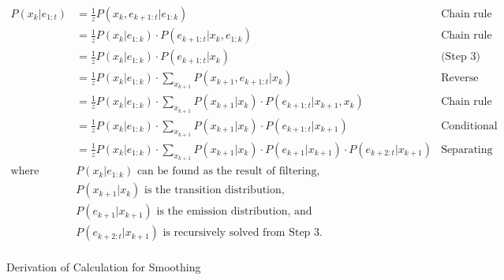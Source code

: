 \begin{landscape}
	\begin{figure}[!htb]
		\caption{Derivation of Calculation for Smoothing}
		\label{eq:smoothing-deriv}
		\begin{align*}
			P(x_k | e_{1:t})
			&= \frac{1}{z} P(x_k, e_{k+1:t} | e_{1:k}) & \textrm{Chain rule} \\
			&= \frac{1}{z} P(x_k | e_{1:k}) \cdot P(e_{k+1:t} | x_k, e_{1:k}) & \textrm{Chain rule} \\
			&= \frac{1}{z} P(x_k | e_{1:k}) \cdot P(e_{k+1:t} | x_k) & \textrm{(Step 3) Conditional 	independence} \\
			&= \frac{1}{z} P(x_k | e_{1:k}) \cdot \sum_{x_{k+1}} P(x_{k+1}, e_{k+1:t} | x_k) & \textrm{Reverse marginalization} \\
			&= \frac{1}{z} P(x_k | e_{1:k}) \cdot \sum_{x_{k+1}} P(x_{k+1} | x_k) \cdot P(e_{k+1:t} | x_{k+1}, x_k) & \textrm{Chain rule} \\
			&= \frac{1}{z} P(x_k | e_{1:k}) \cdot \sum_{x_{k+1}} P(x_{k+1} | x_k) \cdot P(e_{k+1:t} | x_{k+1}) & \textrm{Conditional independence} \\
			&= \frac{1}{z} P(x_k | e_{1:k}) \cdot \sum_{x_{k+1}} P(x_{k+1} | x_k) \cdot P(e_{k+1} | x_{k+1}) \cdot P(e_{k+2:t} | x_{k+1}) & \textrm{Separating multiplied probabilities} \\
			\textrm{where } & P(x_k | e_{1:k}) \textrm{ can be found as the result of filtering,} \\
			& P(x_{k+1} | x_k) \textrm{ is the transition distribution,} \\
			& P(e_{k+1} | x_{k+1}) \textrm{ is the emission distribution, and} \\
			& P(e_{k+2:t} | x_{k+1}) \textrm{ is recursively solved from Step 3.} \\
		\end{align*}
	\end{figure}
\end{landscape}

